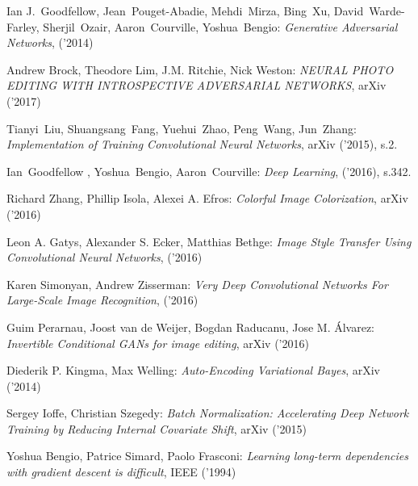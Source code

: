 \begin{thebibliography}{99} %

   Ian J.~Goodfellow, Jean~Pouget-Abadie, Mehdi~Mirza, Bing~Xu, David~Warde-Farley, Sherjil~Ozair, Aaron~Courville, Yoshua~Bengio:
  \emph{Generative Adversarial Networks}, ('2014)

   Andrew Brock, Theodore Lim, J.M. Ritchie,
  Nick Weston:
  \emph{NEURAL PHOTO EDITING WITH INTROSPECTIVE ADVERSARIAL NETWORKS}, arXiv ('2017)

   Tianyi~Liu, Shuangsang~Fang, Yuehui~Zhao, Peng~Wang, Jun~Zhang:
  \emph{Implementation of Training Convolutional Neural Networks}, arXiv ('2015), s.2.

   Ian~Goodfellow ,  Yoshua~Bengio, Aaron~Courville:
  \emph{Deep Learning}, ('2016), s.342.

   Richard Zhang, Phillip Isola, Alexei A. Efros:
  \emph{Colorful Image Colorization}, arXiv ('2016)

   Leon A. Gatys, Alexander S. Ecker, Matthias Bethge:
  \emph{Image Style Transfer Using Convolutional Neural Networks}, ('2016)

   Karen Simonyan, Andrew Zisserman:
  \emph{Very Deep Convolutional Networks For Large-Scale Image Recognition}, ('2016)

   Guim Perarnau, Joost van de Weijer, Bogdan Raducanu, Jose M. Álvarez:
  \emph{Invertible Conditional GANs for image editing}, arXiv ('2016)

   Diederik P. Kingma, Max Welling:
  \emph{Auto-Encoding Variational Bayes}, arXiv ('2014)

   Sergey Ioffe, Christian Szegedy:
  \emph{Batch Normalization: Accelerating Deep Network Training by Reducing
  Internal Covariate Shift}, arXiv ('2015)

   Yoshua Bengio, Patrice Simard, Paolo Frasconi:
  \emph{Learning long-term dependencies with gradient descent is difficult},
  IEEE ('1994)


\end{thebibliography}
